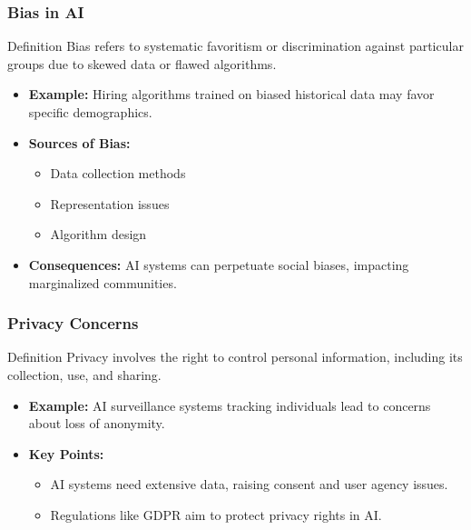 \documentclass[aspectratio=169]{beamer}
\begin{document}
\begin{frame}[fragile]
    \frametitle{Bias in AI}
    \begin{block}{Definition}
        Bias refers to systematic favoritism or discrimination against particular groups due to skewed data or flawed algorithms.
    \end{block}
    \begin{itemize}
        \item \textbf{Example:} Hiring algorithms trained on biased historical data may favor specific demographics.
        \item \textbf{Sources of Bias:}
        \begin{itemize}
            \item Data collection methods
            \item Representation issues
            \item Algorithm design
        \end{itemize}
        \item \textbf{Consequences:} AI systems can perpetuate social biases, impacting marginalized communities.
    \end{itemize}
\end{frame}

\begin{frame}[fragile]
    \frametitle{Privacy Concerns}
    \begin{block}{Definition}
        Privacy involves the right to control personal information, including its collection, use, and sharing.
    \end{block}
    \begin{itemize}
        \item \textbf{Example:} AI surveillance systems tracking individuals lead to concerns about loss of anonymity.
        \item \textbf{Key Points:}
        \begin{itemize}
            \item AI systems need extensive data, raising consent and user agency issues.
            \item Regulations like GDPR aim to protect privacy rights in AI.
        \end{itemize}
    \end{itemize}
\end{frame}
\end{document}
